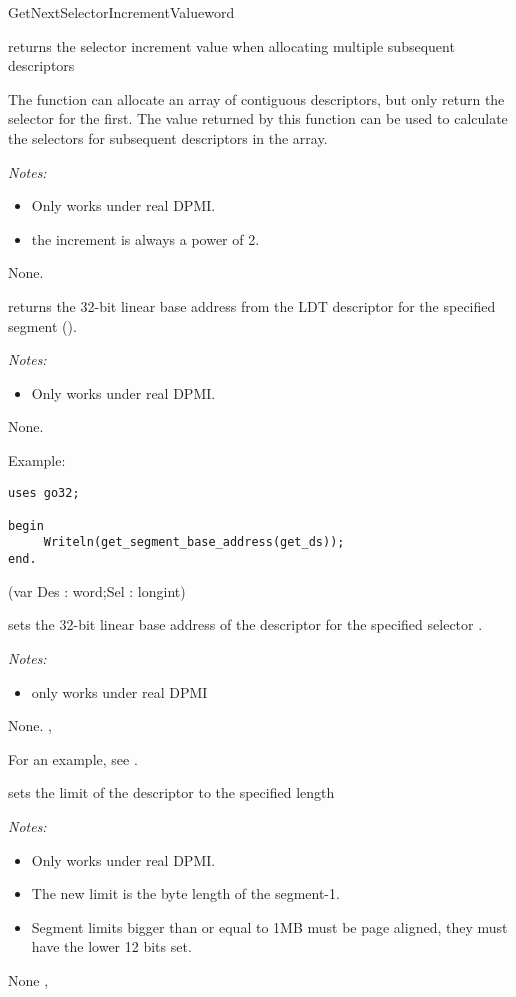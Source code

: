 {GetNextSelectorIncrementValue}{word}
{ returns the selector increment 
value when allocating multiple subsequent descriptors

The function  can allocate an array of
contiguous descriptors, but only return the selector for the first. The
value returned by this function can be used to calculate the selectors
for subsequent descriptors in the array.

{\em Notes:}
\begin{itemize}
\item Only works under real DPMI.
\item the increment is always a power of 2.
\end{itemize}
}
{None.}
{}

{
 returns the 32-bit linear base address 
from the LDT descriptor for the specified segment ().


{\em Notes:}
\begin{itemize}
\item Only works under real DPMI.
\end{itemize}
}
{None.}
{}

\begin{FPCList}
\item[Example:]
\begin{verbatim}
uses go32;

begin
     Writeln(get_segment_base_address(get_ds));
end.
\end{verbatim}
\end{FPCList}

{(var Des : word;Sel : longint)}
{ sets the 32-bit linear base address 
of the descriptor  for the specified selector .

{\em Notes:}
\begin{itemize}
\item only works under real DPMI
\end{itemize}
}
{None.}
{ , }

For an example, see .

{ sets the limit of the descriptor  
to the specified length 

{\em Notes:}
\begin{itemize}
\item Only works under real DPMI.
\item The new limit is the byte length of the segment-1.
\item Segment limits bigger than or equal to 1MB must be page aligned, they
must have the lower 12 bits set.
\end{itemize}
}
{None}
{ , }

